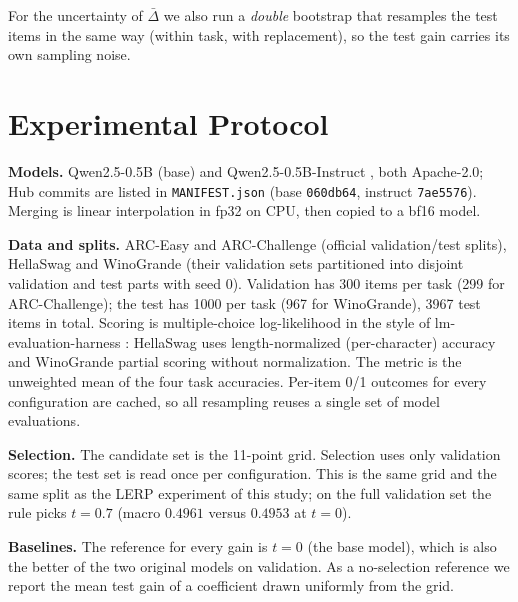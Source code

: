 \documentclass[conference]{IEEEtran}
\begin{document}
For the uncertainty of $\bar\Delta$ we also run a \emph{double} bootstrap that resamples the test items in the same way (within task, with replacement), so the test gain carries its own sampling noise.

\section{Experimental Protocol}
\textbf{Models.} Qwen2.5-0.5B (base) and Qwen2.5-0.5B-Instruct \cite{qwen2024qwen25}, both Apache-2.0; Hub commits are listed in \texttt{MANIFEST.json} (base \texttt{060db64}, instruct \texttt{7ae5576}). Merging is linear interpolation in fp32 on CPU, then copied to a bf16 model.

\textbf{Data and splits.} ARC-Easy and ARC-Challenge \cite{clark2018arc} (official validation/test splits), HellaSwag \cite{zellers2019hellaswag} and WinoGrande \cite{sakaguchi2019winogrande} (their validation sets partitioned into disjoint validation and test parts with seed 0). Validation has 300 items per task (299 for ARC-Challenge); the test has 1000 per task (967 for WinoGrande), 3967 test items in total. Scoring is multiple-choice log-likelihood in the style of lm-evaluation-harness \cite{gao2021lmeval}: HellaSwag uses length-normalized (per-character) accuracy and WinoGrande partial scoring without normalization. The metric is the unweighted mean of the four task accuracies. Per-item 0/1 outcomes for every configuration are cached, so all resampling reuses a single set of model evaluations.

\textbf{Selection.} The candidate set is the 11-point grid. Selection uses only validation scores; the test set is read once per configuration. This is the same grid and the same split as the LERP experiment of this study; on the full validation set the rule picks $t=0.7$ (macro $0.4961$ versus $0.4953$ at $t=0$).

\textbf{Baselines.} The reference for every gain is $t=0$ (the base model), which is also the better of the two original models on validation. As a no-selection reference we report the mean test gain of a coefficient drawn uniformly from the grid.
\end{document}
